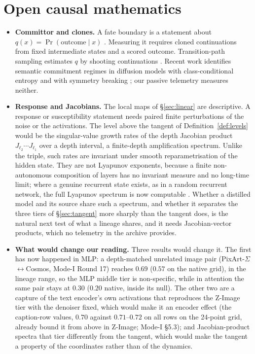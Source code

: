 \documentclass[11pt]{article}
\theoremstyle{definition}
\begin{document}
\section{Open causal mathematics}\label{sec:open}
\begin{itemize}
 \item \textbf{Committor and clones.} A fate boundary is a statement about $q(x)=\Pr(\text{outcome}\mid x)$ \citep{e2010transitionpath}. Measuring it requires cloned continuations from fixed intermediate states and a scored outcome. Transition-path sampling estimates $q$ by shooting continuations \citep{e2006towards,bolhuis2002transition}. Recent work identifies semantic commitment regimes in diffusion models with class-conditional entropy \citep{handke2026entropic} and with symmetry breaking \citep{raya2023spontaneous,biroli2024dynamical,sclocchi2025phase}; our passive telemetry measures neither.
 \item \textbf{Response and Jacobians.} The local maps of \S\ref{sec:linear} are descriptive. A response or susceptibility statement needs paired finite perturbations of the noise or the activations. The level above the tangent of Definition~\ref{def:levels} would be the singular-value growth rates of the depth Jacobian product $J_{\ell_2}\cdots J_{\ell_1}$ over a depth interval, a finite-depth amplification spectrum. Unlike the triple, such rates are invariant under smooth reparametrisation of the hidden state. They are not Lyapunov exponents, because a finite non-autonomous composition of layers has no invariant measure and no long-time limit; where a genuine recurrent state exists, as in a random recurrent network, the full Lyapunov spectrum is now computable \citep{clark2026lyapunov}. Whether a distilled model and its source share such a spectrum, and whether it separates the three tiers of \S\ref{sec:tangent} more sharply than the tangent does, is the natural next test of what a lineage shares, and it needs Jacobian-vector products, which no telemetry in the archive provides.
 \item \textbf{What would change our reading.} Three results would change it. The first has now happened in MLP: a depth-matched unrelated image pair (PixArt-$\Sigma$$\leftrightarrow$Cosmos, Mode-I Round 17) reaches $0.69$ ($0.57$ on the native grid), in the lineage range, so the MLP middle tier is non-specific, while in attention the same pair stays at $0.30$ ($0.20$ native, inside its null). The other two are a capture of the text encoder's own activations that reproduces the Z-Image tier with the denoiser fixed, which would make it an encoder effect (the caption-row values, $0.70$ against $0.71$--$0.72$ on all rows on the 24-point grid, already bound it from above in Z-Image; Mode-I \S5.3); and Jacobian-product spectra that tier differently from the tangent, which would make the tangent a property of the coordinates rather than of the dynamics.
$$
\end{itemize}
\end{document}
